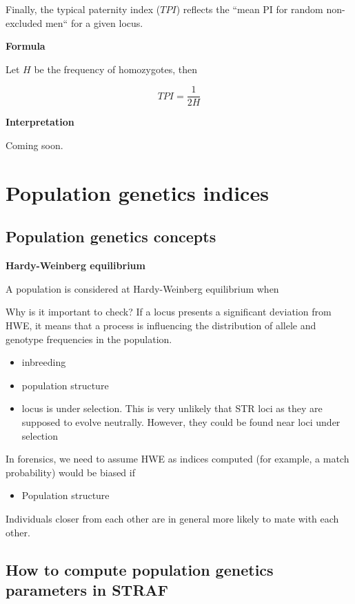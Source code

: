 \documentclass[
]{book}
\providecommand{\tightlist}{%
  \setlength{\itemsep}{0pt}\setlength{\parskip}{0pt}}
\begin{document}
Finally, the typical paternity index (\(TPI\)) reflects the ``mean PI for
random non-excluded men`` for a given locus.

\textbf{Formula}

Let \(H\) be the frequency of homozygotes, then

\[
TPI = \frac{1}{2H}
\]

\textbf{Interpretation}

Coming soon.

\hypertarget{population-genetics-indices}{%
\chapter{Population genetics indices}\label{population-genetics-indices}}

\hypertarget{population-genetics-concepts}{%
\section{Population genetics concepts}\label{population-genetics-concepts}}

\textbf{Hardy-Weinberg equilibrium}

A population is considered at Hardy-Weinberg equilibrium when

Why is it important to check? If a locus presents a significant deviation from
HWE, it means that a process is influencing the distribution of allele and genotype
frequencies in the population.

\begin{itemize}
\item
  inbreeding
\item
  population structure
\item
  locus is under selection. This is very unlikely that STR loci as they are
  supposed to evolve neutrally. However, they could be found near loci under selection
\end{itemize}

In forensics, we need to assume HWE as indices computed (for example, a match probability)
would be biased if

\begin{itemize}
\tightlist
\item
  Population structure
\end{itemize}

Individuals closer from each other are in general more likely to mate with each other.

\hypertarget{how-to-compute-population-genetics-parameters-in-straf}{%
\section{How to compute population genetics parameters in STRAF}\label{how-to-compute-population-genetics-parameters-in-straf}}
\end{document}
